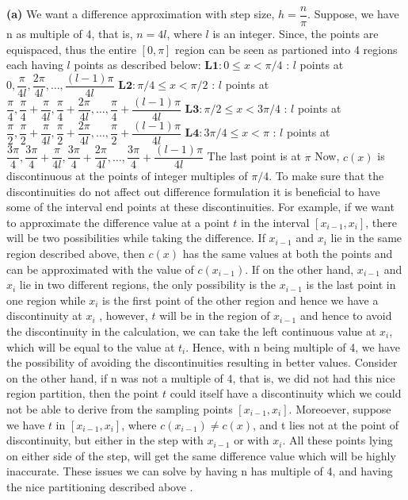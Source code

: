 \documentclass{article}
\renewcommand\part[1]{\vspace{.10in}\textbf{(#1)}}
\begin{document}
  \part{a} We want a difference approximation with step size, $h = \dfrac{n}{\pi}$. Suppose, we have n as multiple of 4, that is, $n=4l$, where $l$ is an integer. Since, the points are equispaced, thus the entire $[0,\pi]$ region can be seen as partioned into 4 regions each having $l$ points as described below: \newline
  $\mathbf {L1:} 0 \leq x < \pi/4$ : $l$ points at $0, \dfrac{\pi}{4l}, \dfrac{2\pi}{4l}, \dots, \dfrac{(l-1)\pi}{4l}$ \newline
  $\mathbf {L2:} \pi/4 \leq x < \pi/2$ : $l$ points at $\dfrac{\pi}{4}, \dfrac{\pi}{4} + \dfrac{\pi}{4l},\dfrac{\pi}{4} + \dfrac{2\pi}{4l}, \dots, \dfrac{\pi}{4} + \dfrac{(l-1)\pi}{4l}$ \newline
  $\mathbf {L3:} \pi/2 \leq x < 3\pi/4$ : $l$ points at $\dfrac{\pi}{2}, \dfrac{\pi}{2} + \dfrac{\pi}{4l},\dfrac{\pi}{2} + \dfrac{2\pi}{4l}, \dots, \dfrac{\pi}{2} + \dfrac{(l-1)\pi}{4l}$ \newline
  $\mathbf {L4:} 3\pi/4 \leq x < \pi$ : $l$ points at $\dfrac{3\pi}{4}, \dfrac{3\pi}{4} + \dfrac{\pi}{4l},\dfrac{3\pi}{4} + \dfrac{2\pi}{4l}, \dots, \dfrac{3\pi}{4} + \dfrac{(l-1)\pi}{4l}$ \newline
  The last point is at $\pi$ \newline
  Now, $c(x)$ is discontinuous at the points of integer multiples of $\pi/4$. To make sure that the discontinuities do not affect out difference formulation it is beneficial to have some of the interval end points at these discontinuities. For example, if we want to approximate the difference value at a point $t$ in the interval $[x_{i-1}, x_i]$, there will be two possibilities while taking the difference. If $x_{i-1}$ and $x_{i}$ lie in the same region described above, then $c(x)$ has the same values at both the points and can be approximated with the value of $c(x_{i-1})$. If on the other hand, $x_{i-1}$ and $x_i$ lie in two different regions, the only possibility is the $x_{i-1}$ is the last point in one region while $x_i$ is the first point of the other region and hence we have a discontinuity at $x_i$ , however, $t$ will be in the region of $x_{i-1}$ and hence to avoid the discontinuity in the calculation, we can take the left continuous value at $x_i$, which will be equal to the value at $t_i$. Hence, with n being multiple of 4, we have the possibility of avoiding the discontinuities resulting in better values. Consider on the other hand, if n was not a multiple of 4, that is, we did not had this nice region partition, then the point $t$ could itself have a discontinuity which we could not be able to derive from the sampling points $[x_{i-1},x_i]$. Moreoever, suppose we have $t$ in $[x_{i-1},x_i]$, where $c(x_{i-1}) \neq c(x)$, and t lies not at the point of discontinuity, but either in the step with $x_{i-1}$ or with $x_i$. All these points lying on either side of the step, will get the same difference value which will be highly inaccurate. These issues we can solve by having n has multiple of 4, and having the nice partitioning described above . \newline
\end{document}
